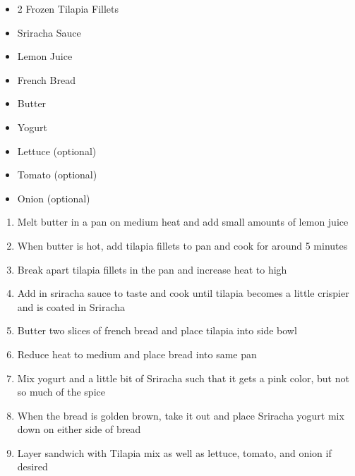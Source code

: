 \documentclass[oneside]{recipe}
\newcommand{\recipecolumn}[2]{
	\begin{multicols}{2}
	\raggedcolumns
	#1
	\columnbreak
	#2
	\end{multicols}
}
\begin{document}
\recipecolumn{
	\begin{itemize}
		\item 2 Frozen Tilapia Fillets
		\item Sriracha Sauce
		\item Lemon Juice
		\item French Bread
		\item Butter
		\item Yogurt
		\item Lettuce (optional)
		\item Tomato (optional)
		\item Onion (optional)
	\end{itemize}
}{
	\begin{enumerate}
		\item Melt butter in a pan on medium heat and add small amounts of lemon juice
		\item When butter is hot, add tilapia fillets to pan and cook for around 5 minutes
		\item Break apart tilapia fillets in the pan and increase heat to high
		\item Add in sriracha sauce to taste and cook until tilapia becomes a little crispier and is coated in Sriracha
		\item Butter two slices of french bread and place tilapia into side bowl
		\item Reduce heat to medium and place bread into same pan
		\item Mix yogurt and a little bit of Sriracha such that it gets a pink color, but not so much of the spice
		\item When the bread is golden brown, take it out and place Sriracha yogurt mix down on either side of bread
		\item Layer sandwich with Tilapia mix as well as lettuce, tomato, and onion if desired
	\end{enumerate}
}
\end{document}
